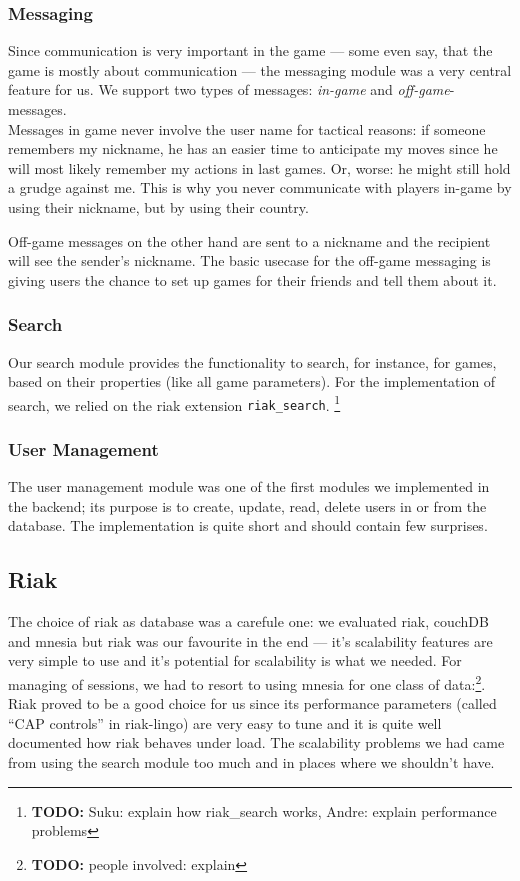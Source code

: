 \documentclass[11pt,a4paper]{report}
\newcommand{\todo}[1]{\footnote{{\color{red} {\bf TODO:} #1}}}
\begin{document}
\subsubsection{Messaging}
Since communication is very important in the game --- some even say, that the
game is mostly about communication --- the messaging module was a very central
feature for us. We support two types of messages: {\em in-game\/} and
{\em off-game\/}-messages.\\
Messages in game never involve the user name for
tactical reasons: if someone remembers my nickname, he has an easier time to
anticipate my moves since he will most likely remember my actions in last games.
Or, worse: he might still hold a grudge against me. This is why you never
communicate with players in-game by using their nickname, but by using their
country.

Off-game messages on the other hand are sent to a nickname and the recipient
will see the sender's nickname. The basic usecase for the off-game messaging is
giving users the chance to set up games for their friends and tell them about
it.
\subsubsection{Search}
Our search module provides the functionality to search, for instance, for games,
based on their properties (like all game parameters). For the implementation of
search, we relied on the riak extension {\tt riak\_search}. \todo{Suku: explain how riak\_search works, Andre: explain performance problems}
\subsubsection{User Management}
The user management module was one of the first modules we implemented in the
backend; its purpose is to create, update, read, delete users in or from the
database. The implementation is quite short and should contain few surprises.

\subsection{Riak}
The choice of riak as database was a carefule one: we evaluated riak, couchDB
and mnesia but riak was our favourite in the end --- it's scalability features
are very simple to use and it's potential for scalability is what we needed.
For managing of sessions, we had to resort to using mnesia for one class of
data:\todo{people involved: explain}. \\
Riak proved to be a good choice for us since its performance parameters (called
``CAP controls'' in riak-lingo) are very easy to tune and it is quite well
documented how riak behaves under load. The scalability problems we had
came from using the search module too much and in places where we shouldn't
have.
\end{document}
